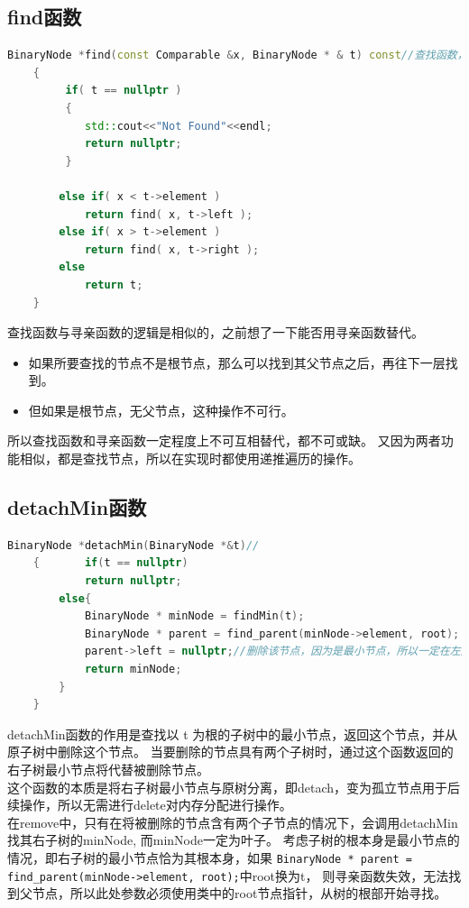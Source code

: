 \documentclass[UTF8]{ctexart}
\begin{document}
\subsection{find函数}
\begin{lstlisting}[language=C++]
    BinaryNode *find(const Comparable &x, BinaryNode * & t) const//查找函数，用于返回节点
    {
         if( t == nullptr )
         {
            std::cout<<"Not Found"<<endl;
            return nullptr;
         }
            
        else if( x < t->element )
            return find( x, t->left );
        else if( x > t->element )
            return find( x, t->right );
        else
            return t;    
    }
\end{lstlisting}

    
    查找函数与寻亲函数的逻辑是相似的，之前想了一下能否用寻亲函数替代。
\begin{itemize}
    \item 如果所要查找的节点不是根节点，那么可以找到其父节点之后，再往下一层找到。
    \item 但如果是根节点，无父节点，这种操作不可行。
\end{itemize}
    
    所以查找函数和寻亲函数一定程度上不可互相替代，都不可或缺。
    又因为两者功能相似，都是查找节点，所以在实现时都使用递推遍历的操作。

\subsection{detachMin函数}
\begin{lstlisting}[language=C++]
    BinaryNode *detachMin(BinaryNode *&t)//
    {       if(t == nullptr)
            return nullptr;
        else{
            BinaryNode * minNode = findMin(t);
            BinaryNode * parent = find_parent(minNode->element, root);
            parent->left = nullptr;//删除该节点，因为是最小节点，所以一定在左边
            return minNode;
        }
    }
\end{lstlisting}
    detachMin函数的作用是查找以 t 为根的子树中的最小节点，返回这个节点，并从原子树中删除这个节点。
    当要删除的节点具有两个子树时，通过这个函数返回的右子树最小节点将代替被删除节点。\\
    这个函数的本质是将右子树最小节点与原树分离，即detach，变为孤立节点用于后续操作，所以无需进行delete对内存分配进行操作。\\
    在remove中，只有在将被删除的节点含有两个子节点的情况下，会调用detachMin找其右子树的minNode,
    而minNode一定为叶子。
    考虑子树的根本身是最小节点的情况，即右子树的最小节点恰为其根本身，如果
    \lstinline|BinaryNode * parent = find_parent(minNode->element, root);|中root换为t，
    则寻亲函数失效，无法找到父节点，所以此处参数必须使用类中的root节点指针，从树的根部开始寻找。
\end{document}
